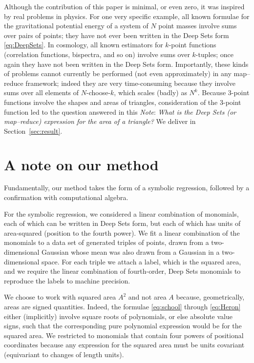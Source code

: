 \documentclass[12pt]{article}
\newcommand{\documentname}{\textsl{Note}}
\newcommand{\sectionname}{Section}
\newcommand{\secref}[1]{\sectionname~\ref{#1}}
\begin{document}
Although the contribution of this paper is minimal, or even zero, it was inspired by real problems in physics.
For one very specific example, all known formulae for the gravitational potential energy of a system of $N$ point masses involve sums over pairs of points; they have not ever been written in the Deep Sets form \eqref{eq:DeepSets}.
In cosmology, all known estimators for $k$-point functions (correlation functions, bispectra, and so on) involve sums over $k$-tuples; once again they have not been written in the Deep Sets form.
Importantly, these kinds of problems cannot currently be performed (not even approximately) in any map--reduce framework; indeed they are very time-consuming because they involve sums over all elements of $N$-choose-$k$, which scales (badly) as $N^k$.
Because 3-point functions involve the shapes and areas of triangles, consideration of the 3-point function led to the question answered in this \documentname:
\emph{What is the Deep Sets (or map--reduce) expression for the area of a triangle?}
We deliver in \secref{sec:result}.

\section{A note on our method}\label{sec:method}
Fundamentally, our method takes the form of a symbolic regression, followed by a confirmation with computational algebra.

For the symbolic regression, we considered a linear combination of monomials, each of which can be written in Deep Sets form, but each of which has units of area-squared (position to the fourth power).
We fit a linear combination of the monomials to a data set of generated triples of points, drawn from a two-dimensional Gaussian whose mean was also drawn from a Gaussian in a two-dimensional space.
For each triple we attach a label, which is the squared area, and we require the linear combination of fourth-order, Deep Sets monomials to reproduce the labels to machine precision.

We choose to work with squared area $A^2$ and not area $A$ because, geometrically, areas are signed quantities.
Indeed, the formulae \eqref{eq:school} through \eqref{eq:Heron} either (implicitly) involve square roots of polynomials, or else absolute value signs, such that the corresponding pure polynomial expression would be for the squared area.
We restricted to monomials that contain four powers of positional coordinates because any expression for the squared area must be units covariant (equivariant to changes of length units).
\end{document}

